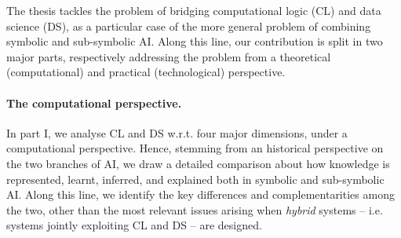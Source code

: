 \documentclass[12pt]{scrartcl}
\begin{document}
%
%
%
%

The thesis tackles the problem of bridging computational logic (CL) and data science (DS), as a particular case of the more general problem of combining symbolic and sub-symbolic AI.
%
Along this line, our contribution is split in two major parts, respectively addressing the problem from a theoretical (computational) and practical (technological) perspective.

\paragraph{The computational perspective.}

In part I, we analyse CL and DS w.r.t. four major dimensions, under a computational perspective. %
%
Hence, stemming from an historical perspective on the two branches of AI, we draw a detailed comparison about how knowledge is represented, learnt, inferred, and explained both in symbolic and sub-symbolic AI.
%
Along this line, we identify the key differences and complementarities among the two, other than the most relevant issues arising when \emph{hybrid} systems -- i.e. systems jointly exploiting CL and DS -- are designed.
\end{document}

